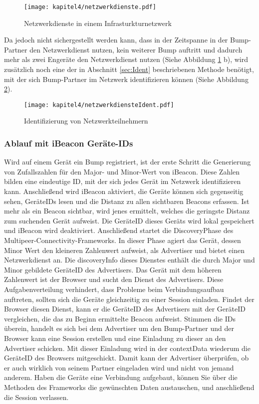 \begin{figure}[H]
    \centering
    \texttt{[image: kapitel4/netzwerkdienste.pdf]}
    \caption{Netzwerkdienste in einem Infrasturkturnetzwerk}
    \label{fig:dienste}
\end{figure}

Da jedoch nicht sichergestellt werden kann, dass in der Zeitspanne in der Bump-Partner den Netzwerkdienst nutzen, kein weiterer Bump auftritt und dadurch mehr als zwei Engeräte den Netzwerkdienst nutzen (Siehe Abbildung \ref{fig:dienste} b), wird zusätzlich noch eine der in Abschnitt \ref{sec:Ident} beschriebenen Methode benötigt, mit der sich Bump-Partner im Netzwerk identifizieren können (Siehe Abbildung \ref{fig:diensteIdent}).

\begin{figure}[H]
    \centering
    \texttt{[image: kapitel4/netzwerkdiensteIdent.pdf]}
    \caption{Identifizierung von Netzwerkteilnehmern}
    \label{fig:diensteIdent}
\end{figure}

\newpage
\subsubsection{Ablauf mit iBeacon Geräte-IDs}
Wird auf einem Gerät ein Bump registriert, ist der erste Schritt die Generierung von Zufallszahlen für den Major- und Minor-Wert von iBeacon. Diese Zahlen bilden eine eindeutige ID, mit der sich jedes Gerät im Netzwerk identifizieren kann. Anschließend wird iBeacon aktiviert, die Geräte können sich gegenseitig sehen, GeräteIDs lesen und die Distanz zu allen sichtbaren Beacons erfassen. Ist mehr als ein Beacon sichtbar, wird jenes ermittelt, welches die geringste Distanz zum suchenden Gerät aufweist. Die GeräteID dieses Geräts wird lokal gespeichert und iBeacon wird deaktiviert. Anschließend startet die DiscoveryPhase des Multipeer-Connectivity-Frameworks. In dieser Phase agiert das Gerät, dessen Minor Wert den kleineren Zahlenwert aufweist, als Advertiser und bietet einen Netzwerkdienst an. Die discoveryInfo dieses Dienstes enthält die durch Major und Minor gebildete GeräteID des Advertisers. Das Gerät mit dem höheren Zahlenwert ist der Browser und sucht den Dienst des Advertisers. Diese Aufgabenverteilung verhindert, dass Probleme beim Verbindungsaufbau auftreten, sollten sich die Geräte gleichzeitig zu einer Session einladen.
Findet der Browser diesen Dienst, kann er die GeräteID des Advertisers mit der GeräteID vergleichen, die das zu Beginn ermittelte Beacon aufweist. Stimmen die IDs überein, handelt es sich bei dem Advertiser um den Bump-Partner und der Browser kann eine Session erstellen und eine Einladung zu dieser an den Advertiser schicken. Mit dieser Einladung wird in der contextData wiederum die GeräteID des Browsers mitgeschickt. Damit kann der Advertiser überprüfen, ob er auch wirklich von seinem Partner eingeladen wird und nicht von jemand anderem. Haben die Geräte eine Verbindung aufgebaut, können Sie über die Methoden des Frameworks die gewünschten Daten austauschen, und anschließend die Session verlassen. 


